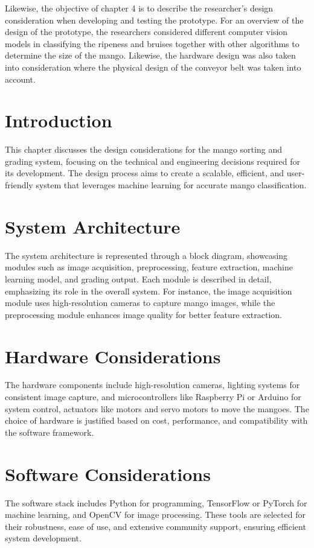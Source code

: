 
Likewise, the objective of chapter 4 is to describe the researcher's design consideration when developing and testing the prototype. For an overview of the design of the prototype, the researchers considered different computer vision models in classifying the ripeness and bruises together with other algorithms to determine the size of the mango. Likewise, the hardware design was also taken into consideration where the physical design of the conveyor belt was taken into account.

\section{Introduction}
This chapter discusses the design considerations for the mango sorting and grading system, focusing on the technical and engineering decisions required for its development. The design process aims to create a scalable, efficient, and user-friendly system that leverages machine learning for accurate mango classification.
\section{System Architecture}
The system architecture is represented through a block diagram, showcasing modules such as image acquisition, preprocessing, feature extraction, machine learning model, and grading output. Each module is described in detail, emphasizing its role in the overall system. For instance, the image acquisition module uses high-resolution cameras to capture mango images, while the preprocessing module enhances image quality for better feature extraction.
\section{Hardware Considerations}
The hardware components include high-resolution cameras, lighting systems for consistent image capture, and microcontrollers like Raspberry Pi or Arduino for system control, actuators like motors and servo motors to move the mangoes. The choice of hardware is justified based on cost, performance, and compatibility with the software framework.
\section{Software Considerations}
The software stack includes Python for programming, TensorFlow or PyTorch for machine learning, and OpenCV for image processing. These tools are selected for their robustness, ease of use, and extensive community support, ensuring efficient system development.

